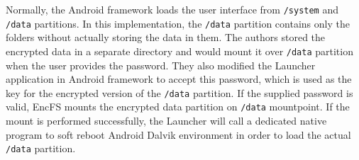 Normally, the Android framework loads the user interface from \texttt{/system} and \texttt{/data} partitions. In this implementation, the \texttt{/data} partition contains only the folders without actually storing the data in them. The authors stored the encrypted data in a separate directory and would mount it over \texttt{/data} partition when the user provides the password.
They also modified the Launcher application in Android framework to accept this password, which is used as the key for the encrypted version of the \texttt{/data} partition. If the supplied password is valid, EncFS mounts the encrypted data partition on \texttt{/data} mountpoint. If the mount is performed successfully, the Launcher will call a dedicated native program to soft reboot Android Dalvik environment in order to load the actual \texttt{/data} partition.